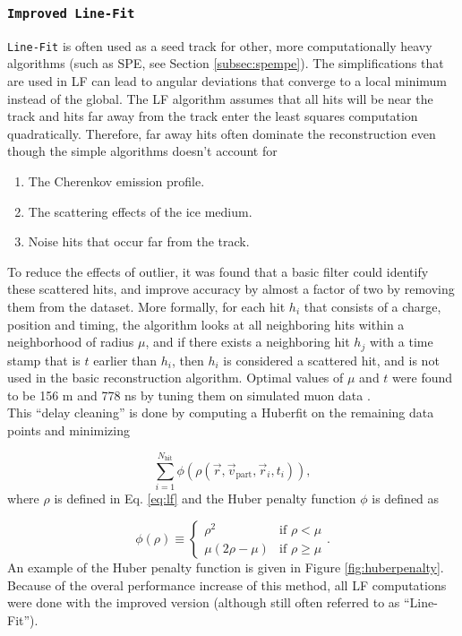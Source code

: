 \subsubsection{\texttt{Improved Line-Fit}}
\texttt{Line-Fit} is often used as a seed track for other, more computationally heavy algorithms (such as SPE, see Section \ref{subsec:spempe}). The simplifications that are used in LF can lead to angular deviations that converge to a local minimum instead of the global. The LF algorithm assumes that all hits will be near the track and hits far away from the track enter the least squares computation quadratically. Therefore, far away hits often dominate the reconstruction even though the simple algorithms doesn't account for 

\vspace{2mm}
\begin{enumerate}
\item The Cherenkov emission profile.
\item The scattering effects of the ice medium.
\item Noise hits that occur far from the track.
\end{enumerate}
\vspace{2mm}

\noindent To reduce the effects of outlier, it was found that a basic filter could identify these scattered hits, and improve accuracy by almost a factor of two by removing them from the dataset. More formally, for each hit $h_i$ that consists of a charge, position and timing, the algorithm looks at all neighboring hits within a neighborhood of radius $\mu$, and if there exists a neighboring hit $h_j$ with a time stamp that is $t$ earlier than $h_i$, then $h_i$ is considered a scattered hit, and is not used in the basic reconstruction algorithm. Optimal values of $\mu$ and $t$ were found to be 156 m and 778 ns by tuning them on simulated muon data \cite{Aartsen:2013bfa}.\\

\noindent This ``delay cleaning'' is done by computing a Huberfit on the remaining data points and minimizing

\begin{equation}
\sum^{N_{\textrm{hit}}}_{i=1} \phi(\rho(\vec{r},\vec{v}_\textrm{part},\vec{r}_i,t_i)),
\end{equation}
\noindent where $\rho$ is defined in Eq. \ref{eq:lf} and the Huber penalty function $\phi$ is defined as

\begin{equation}
\phi(\rho) \equiv \left\{
    \begin{array}{ll}
        \rho^2 &\textrm{if } \rho < \mu \\
        \mu\left(2\rho - \mu\right) & \textrm{if }\rho \geq \mu
    \end{array}
    \right.
    .
\end{equation}
\noindent An example of the Huber penalty function is given in Figure \ref{fig:huberpenalty}. Because of the overal performance increase of this method, all LF computations were done with the improved version (although still often referred to as ``Line-Fit'').

